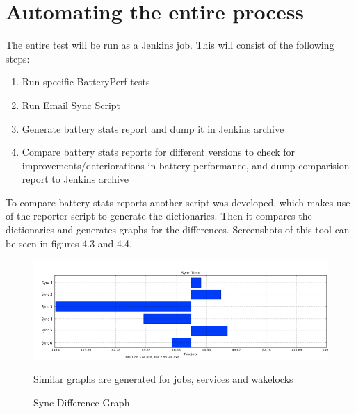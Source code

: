 \section{Automating the entire process} The entire test will be run as a Jenkins job. This will consist of the following steps:
\begin{enumerate}
	\item Run specific BatteryPerf tests
	\item Run Email Sync Script
	\item Generate battery stats report and dump it in Jenkins archive
	\item Compare battery stats reports for different versions to check for improvements/deteriorations in battery performance, and dump comparision report to Jenkins archive

\end{enumerate}
To compare battery stats reports another script was developed, which makes use of the reporter script to generate the dictionaries. Then it compares the dictionaries and generates graphs for the differences. Screenshots of this tool can be seen in figures 4.3 and 4.4.
\begin{figure}[!h]
 	\begin{center}
		\includegraphics[scale=0.5]{diff2}
		\caption{Sync Difference Graph}
		Similar graphs are generated for jobs, services and wakelocks
	\end{center}
\end{figure}
